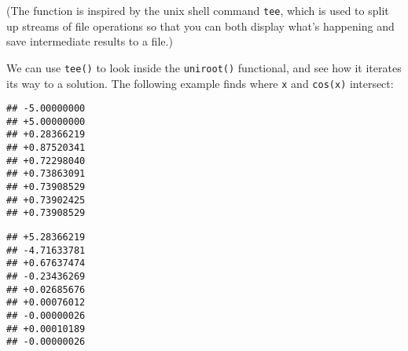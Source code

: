 (The function is inspired by the unix shell command \texttt{tee}, which
is used to split up streams of file operations so that you can both
display what's happening and save intermediate results to a file.)

We can use \texttt{tee()} to look inside the \texttt{uniroot()}
functional, and see how it iterates its way to a solution. The following
example finds where \texttt{x} and \texttt{cos(x)} intersect:

\begin{Shaded}
\end{Shaded}

\begin{verbatim}
## -5.00000000 
## +5.00000000 
## +0.28366219 
## +0.87520341 
## +0.72298040 
## +0.73863091 
## +0.73908529 
## +0.73902425 
## +0.73908529
\end{verbatim}

\begin{Shaded}
\begin{Highlighting}[]
\StringTok{ }\NormalTok{(}\NormalTok{(}\OperatorTok{-}\NormalTok{, }\NormalTok{))}
\end{Highlighting}
\end{Shaded}

\begin{verbatim}
## +5.28366219 
## -4.71633781 
## +0.67637474 
## -0.23436269 
## +0.02685676 
## +0.00076012 
## -0.00000026 
## +0.00010189 
## -0.00000026
\end{verbatim}

